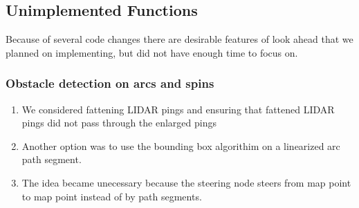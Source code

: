 \subsection{Unimplemented Functions}
Because of several code changes there are desirable features of look ahead that we planned on implementing, but did
not have enough time to focus on.


\subsubsection{Obstacle detection on arcs and spins}
 \begin{enumerate}
   \item We considered fattening LIDAR pings and ensuring that fattened LIDAR pings did not pass through the enlarged pings
 
   \item Another option was to use the bounding box algorithim on a linearized arc path segment.
   \item  The idea became unecessary because the steering node steers from map point to map point instead of by path segments.
  \end{enumerate}






